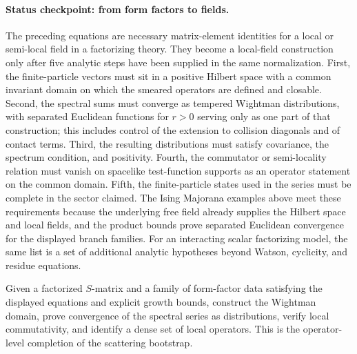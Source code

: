 \paragraph{Status checkpoint: from form factors to fields.}
The preceding equations are necessary matrix-element identities for a local
or semi-local field in a factorizing theory.  They become a local-field
construction only after five analytic steps have been supplied in the same
normalization.  First, the finite-particle vectors must sit in a positive
Hilbert space with a common invariant domain on which the smeared operators
are defined and closable.  Second, the spectral sums must converge as
tempered Wightman distributions, with separated Euclidean functions for
\(r>0\) serving only as one part of that construction; this includes control
of the extension to collision diagonals and of contact terms.  Third, the
resulting distributions must satisfy covariance,
the spectrum condition, and positivity.  Fourth, the commutator or
semi-locality relation must vanish on spacelike test-function supports as an
operator statement on the common domain.  Fifth, the finite-particle states
used in the series must be complete in the sector claimed.  The Ising
Majorana examples above meet these requirements because the underlying free
field already supplies the Hilbert space and local fields, and the product
bounds prove separated Euclidean convergence for the displayed branch
families.  For an interacting scalar factorizing model, the same list is a
set of additional analytic hypotheses beyond Watson, cyclicity, and residue
equations.

\begin{openproblem}
\label{op:form-factor-local-reconstruction}
Given a factorized \(S\)-matrix and a family of form-factor data satisfying
the displayed equations and explicit growth bounds, construct the Wightman
domain, prove convergence of the spectral series as distributions, verify
local commutativity, and identify a dense set of local operators.  This is
the operator-level completion of the scattering bootstrap.
\end{openproblem}
